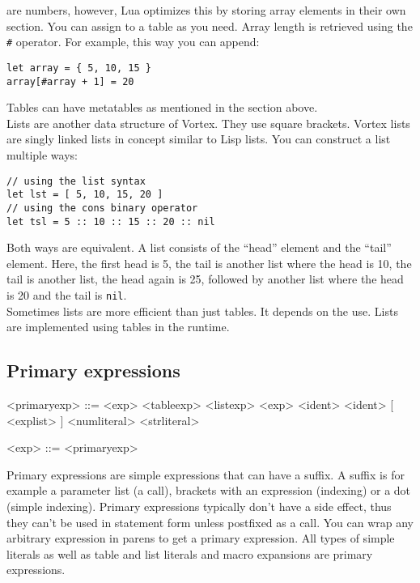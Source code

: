 \documentclass{article}
\newenvironment{bnf}
{
\begin{mdframed}
\begin{grammar}
}
{
\end{grammar}
\end{mdframed}
}
\begin{document}
are numbers, however, Lua optimizes this by storing array elements in their
own section. You can assign to a table as you need. Array length is retrieved
using the \verb|#| operator. For example, this way you can append:
\begin{lstlisting}[language=vortex]
let array = { 5, 10, 15 }
array[#array + 1] = 20
\end{lstlisting}
Tables can have metatables as mentioned in the section above.\\
Lists are another data structure of Vortex. They use square brackets. Vortex
lists are singly linked lists in concept similar to Lisp lists. You can
construct a list multiple ways:
\begin{lstlisting}[language=vortex]
// using the list syntax
let lst = [ 5, 10, 15, 20 ]
// using the cons binary operator
let tsl = 5 :: 10 :: 15 :: 20 :: nil
\end{lstlisting}
Both ways are equivalent. A list consists of the \enquote{head} element
and the \enquote{tail} element. Here, the first head is 5, the tail is another
list where the head is 10, the tail is another list, the head again is 25,
followed by another list where the head is 20 and the tail is \verb|nil|.\\
Sometimes lists are more efficient than just tables. It depends on the use.
Lists are implemented using tables in the runtime.
\subsection{Primary expressions}
\begin{bnf}
<primaryexp> ::= \lit{(} <exp> \lit{)}
    \alt <tableexp>
    \alt <listexp>
    \alt \lit{\$(} <exp> \lit{)}
    \alt \lit{\$} <ident>
    \alt <ident> [ \lit{!} \lit{(} <explist> \lit{)} ]
    \alt <numliteral>
    \alt <strliteral>
    \alt {}
    \alt {}
    \alt {}

<exp> ::= <primaryexp>
\end{bnf}
Primary expressions are simple expressions that can have a suffix. A suffix
is for example a parameter list (a call), brackets with an expression
(indexing) or a dot (simple indexing). Primary expressions typically don't
have a side effect, thus they can't be used in statement form unless postfixed
as a call. You can wrap any arbitrary expression in parens to get a primary
expression. All types of simple literals as well as table and list literals
and macro expansions are primary expressions.
\end{document}
